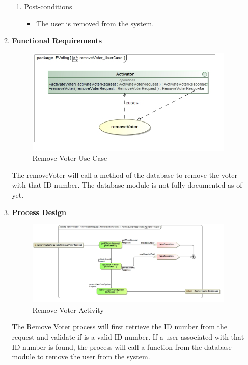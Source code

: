 \begin{enumerate}
\begin{enumerate}
\begin{enumerate}
				\item Post-conditions
				\begin{itemize}
					\item The user is removed from the system.
				\end{itemize}
			\end{enumerate}
			
			\item \textbf{Functional Requirements}
			\begin{figure}[H]
				\centering
				\includegraphics[width=0.75\linewidth]{../Images/Activator/UseCase/removeVoter_UserCase.jpg}
				\caption{Remove Voter Use Case}
			\end{figure}
			
			The removeVoter will call a method of the database to remove the voter with that ID number. The database module is not fully documented as of yet.
			\newline
			
			\item \textbf{Process Design}
			\begin{figure}[H]
				\centering
				\includegraphics[width=0.75\linewidth]{../Images/Activator/Activity/removeVoter.jpg}
				\caption{Remove Voter Activity}
			\end{figure}
			
				The Remove Voter process will first retrieve the ID number from the request and validate if is a valid ID number. If a user associated with that ID number is found, the process will call a function from the database module to remove the user from the system.
			\newline
		\end{enumerate}
\end{enumerate}